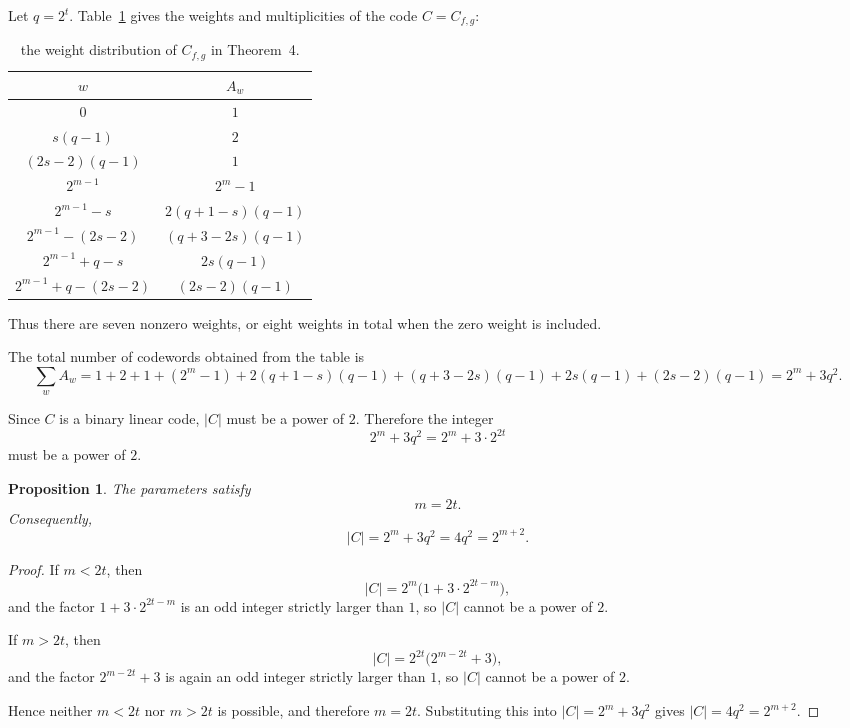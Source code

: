 \documentclass[11pt]{article}
\newtheorem{proposition}[theorem]{Proposition}
\begin{document}
Let $q=2^t$. Table~\ref{tab:source-table1} gives the weights and multiplicities of the code $C=C_{f,g}$:
\begin{table}[h]
\centering
\caption{the weight distribution of $C_{f,g}$ in Theorem~4.}
\label{tab:source-table1}
\begin{tabular}{c|c}
$w$ & $A_w$ \\
\hline
$0$ & $1$ \\
$s(q-1)$ & $2$ \\
$(2s-2)(q-1)$ & $1$ \\
$2^{m-1}$ & $2^m-1$ \\
$2^{m-1}-s$ & $2(q+1-s)(q-1)$ \\
$2^{m-1}-(2s-2)$ & $(q+3-2s)(q-1)$ \\
$2^{m-1}+q-s$ & $2s(q-1)$ \\
$2^{m-1}+q-(2s-2)$ & $(2s-2)(q-1)$
\end{tabular}
\end{table}

Thus there are seven nonzero weights, or eight weights in total when the zero weight is included.

The total number of codewords obtained from the table is
\begin{equation}
\sum_w A_w
=1+2+1+(2^m-1)+2(q+1-s)(q-1)+(q+3-2s)(q-1)+2s(q-1)+(2s-2)(q-1)
=2^m+3q^2.
\end{equation}

Since $C$ is a binary linear code, $|C|$ must be a power of $2$. Therefore the integer
\begin{equation}
2^m+3q^2=2^m+3\cdot 2^{2t}
\end{equation}
must be a power of $2$.

\begin{proposition}
The parameters satisfy
\begin{equation}
m=2t.
\end{equation}
Consequently,
\begin{equation}
|C|=2^m+3q^2=4q^2=2^{m+2}.
\end{equation}
\end{proposition}

\begin{proof}
If $m<2t$, then
\begin{equation}
|C|=2^m\bigl(1+3\cdot 2^{2t-m}\bigr),
\end{equation}
and the factor $1+3\cdot 2^{2t-m}$ is an odd integer strictly larger than $1$, so $|C|$ cannot be a power of $2$.

If $m>2t$, then
\begin{equation}
|C|=2^{2t}\bigl(2^{m-2t}+3\bigr),
\end{equation}
and the factor $2^{m-2t}+3$ is again an odd integer strictly larger than $1$, so $|C|$ cannot be a power of $2$.

Hence neither $m<2t$ nor $m>2t$ is possible, and therefore $m=2t$. Substituting this into $|C|=2^m+3q^2$ gives $|C|=4q^2=2^{m+2}$.
\end{proof}
\end{document}
